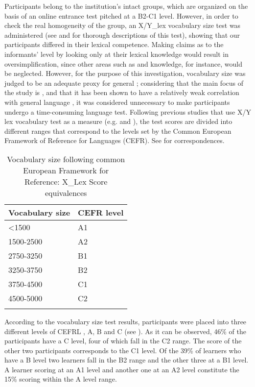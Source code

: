 \documentclass[output=paper]{langsci/langscibook}
\begin{document}
Participants belong to the institution’s intact groups, which are organized on the basis of an online entrance test pitched at a B2-C1 level. However, in order to check the real homogeneity of the group, an X/Y\_lex vocabulary size test was administered (see \citealt{Meara2005} and \citealt{MearaMiralpeix2006} for thorough descriptions of this test), showing that our participants differed in their lexical competence. Making claims as to the informants’  level by looking only at their lexical knowledge would result in oversimplification, since other areas such as  and  knowledge, for instance, would be neglected. However, for the purpose of this investigation, vocabulary size was judged to be an adequate proxy for general   \citep{Milton2010}; considering that the main focus of the study is , and that it has been shown to have a relatively weak correlation with general language , it was considered unnecessary to make participants undergo a time-consuming language  test. Following previous studies that use X/Y lex vocabulary test as a  measure (e.g. \citealt{Meara2005} and \citealt{MearaMiralpeix2006}), the test scores are divided into different ranges that correspond to the  levels set by the Common European Framework of Reference for Languages (CEFR). See  for correspondences.


\begin{table}
\caption{\label{tab:monje:1} Vocabulary size following common European Framework for Reference: X\_Lex Score equivalences}
\begin{tabularx}{.8\textwidth}{XX}
\lsptoprule

{Vocabulary size} & CEFR level\\
\midrule
 <1500 &    A1\\
 1500-2500   & A2\\
 2750-3250   & B1\\
 3250-3750   & B2\\
 3750-4500   & C1\\
 4500-5000   & C2\\
\lspbottomrule
\end{tabularx}
\end{table}


According to the vocabulary size test results, participants were placed into three different levels of CEFRL , A, B and C (see ). As it can be observed, 46\% of the participants have a C level, four of which fall in the C2 range. The score of the other two participants corresponds to the C1 level. Of the 39\% of learners who have a B level two learners fall in the B2 range and the other three at a B1 level. A learner scoring at an A1 level and another one at an A2 level constitute the 15\% scoring within the A level range.
\end{document}

